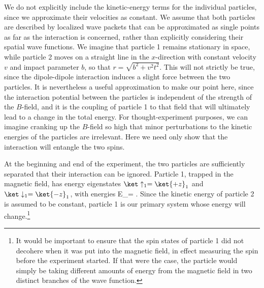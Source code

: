 \documentclass[12pt,aps,prd,onecolumn,nofootinbib,notitlepage]{revtex4-1}
\begin{document}
We do not explicitly include the kinetic-energy terms for the individual particles, since we approximate their velocities as constant.
We assume that both particles are described by localized wave packets that can be approximated as single points as far as the interaction is concerned, rather than explicitly considering their spatial wave functions.
We imagine that particle 1 remains stationary in space, while particle 2 moves on a straight line in the $x$-direction with constant velocity $v$ and impact parameter $b$, so that $r=\sqrt{b^2 + v^2t^2}$.
This will not strictly be true, since the dipole-dipole interaction induces a slight force between the two particles.
It is nevertheless a useful approximation to make our point here, since the interaction potential between the particles is independent of the strength of the $B$-field, and it is the coupling of particle 1 to that field that will ultimately lead to a change in the total energy. 
For thought-experiment purposes, we can imagine cranking up the $B$-field so high that minor perturbations to the kinetic energies of the particles are irrelevant. Here we need only show that the interaction will entangle the two spins.

At the beginning and end of the experiment, the two particles are sufficiently separated that their interaction can be ignored.
Particle 1, trapped in the magnetic field, has energy eigenstates $\ket\uparrow_1 = \ket{+z}_1$ and $\ket\downarrow_1=\ket{-z}_1$, with energies 
\be
E_\pm = \pm {}\omega.
\label{energy_eigenvalues}
\ee
Since the kinetic energy of particle 2 is assumed to be constant, particle 1 is our primary system whose energy will change.\footnote{It would be important to ensure that the spin states of particle 1 did not decohere when it was put into the magnetic field, in effect measuring the spin before the experiment started.
If that were the case, the particle would simply be taking different amounts of energy from the magnetic field in two distinct branches of the wave function.}
\end{document}
